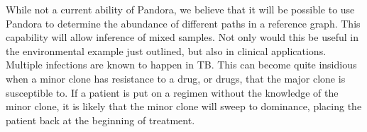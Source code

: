 
While not a current ability of Pandora, we believe that it will be possible to use Pandora to determine the abundance of different paths in a reference graph. This capability will allow inference of mixed samples. Not only would this be useful in the environmental example just outlined, but also in clinical applications. Multiple infections are known to happen in TB. This can become quite insidious when a minor clone has resistance to a drug, or drugs, that the major clone is susceptible to. If a patient is put on a regimen without the knowledge of the minor clone, it is likely that the minor clone will sweep to dominance, placing the patient back at the beginning of treatment.


